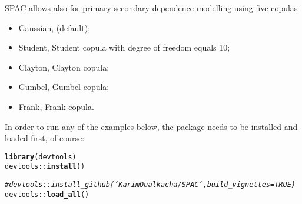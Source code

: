 \documentclass{article}\usepackage[]{graphicx}\usepackage[]{color}
\makeatletter
\newcommand{\hlcom}[1]{\textcolor[rgb]{0.678,0.584,0.686}{\textit{#1}}}%
\newcommand{\hlopt}[1]{\textcolor[rgb]{0,0,0}{#1}}%
\newcommand{\hlstd}[1]{\textcolor[rgb]{0.345,0.345,0.345}{#1}}%
\newcommand{\hlkwd}[1]{\textcolor[rgb]{0.737,0.353,0.396}{\textbf{#1}}}%
\newenvironment{kframe}{%
 \def\at@end@of@kframe{}%
 \ifinner\ifhmode%
  \def\at@end@of@kframe{\end{minipage}}%
  \begin{minipage}{\columnwidth}%
 \fi\fi%
 \def\FrameCommand##1{\hskip\@totalleftmargin \hskip-\fboxsep
 \colorbox{shadecolor}{##1}\hskip-\fboxsep
     \hskip-\linewidth \hskip-\@totalleftmargin \hskip\columnwidth}%
 \MakeFramed {\advance\hsize-\width
   \@totalleftmargin\z@ \linewidth\hsize
   \@setminipage}}%
 {\par\unskip\endMakeFramed%
 \at@end@of@kframe}
\newenvironment{knitrout}{}{} %
\makeatother
\begin{document}
SPAC allows also for primary-secondary dependence modelling using five copulas

\begin{itemize}
  \item Gaussian, (default);
  \item Student, Student copula with degree of freedom equals 10;
  \item Clayton, Clayton copula;
  \item Gumbel, Gumbel copula;
  \item Frank, Frank copula.
  \end{itemize}

In order to run any of the examples below, the package needs to be installed and loaded first, of course:
\begin{knitrout}
\color{fgcolor}\begin{kframe}
\begin{alltt}
\hlkwd{library}\hlstd{(devtools)}
\hlstd{devtools}\hlopt{::}\hlkwd{install}\hlstd{()}
\end{alltt}


{\ttfamily\noindent\itshape\color{messagecolor}{\#\# Installing SPAC}}

{\ttfamily\noindent\itshape{}}

{\ttfamily\noindent\itshape\color{messagecolor}{\#\# }}\begin{alltt}
\hlcom{# devtools::install_github('KarimOualkacha/SPAC', build_vignettes = TRUE)}
\hlstd{devtools}\hlopt{::}\hlkwd{load_all}\hlstd{()}
\end{alltt}


{\ttfamily\noindent\itshape\color{messagecolor}{\#\# Loading SPAC}}

{\ttfamily\noindent\itshape\color{messagecolor}{\#\# Loading required package: MASS}}

{\ttfamily\noindent\itshape\color{messagecolor}{\#\# Loading required package: LaplacesDemon}}


\end{kframe}
\end{knitrout}
\end{document}
